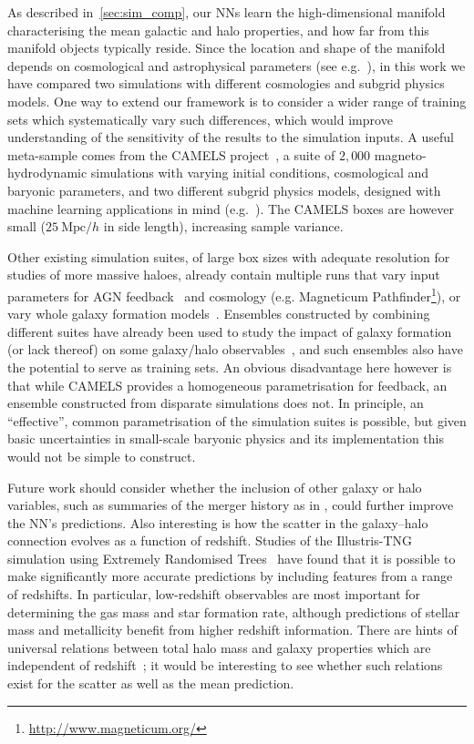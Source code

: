 \documentclass[usenatbib,useAMS]{mnras}
\begin{document}
As described in~\cref{sec:sim_comp}, our \acp{NN} learn the high-dimensional manifold characterising the mean galactic and halo properties, and how far from this manifold objects typically reside. Since the location and shape of the manifold depends on cosmological and astrophysical parameters (see e.g.~\cite{Villaescusa2022SingleGalaxy}), in this work we have compared two simulations with different cosmologies and subgrid physics models.  One way to extend our framework is to consider a wider range of training sets which systematically vary such differences, which would improve understanding of the sensitivity of the results to the simulation inputs. A useful meta-sample comes from the CAMELS project~\citep{CAMELS_2021,CAMELS_2022}, a suite of $2,000$ magneto-hydrodynamic simulations with varying initial conditions, cosmological and baryonic parameters, and two different subgrid physics models, designed  with machine learning applications in mind (e.g.~\citealt{Villaescusa_Navarro_2021_marg}). The CAMELS boxes are however small ($25~\mathrm{Mpc}/h$ in side length), increasing sample variance.

Other existing simulation suites, of large box sizes with adequate resolution for studies of more massive haloes, already contain multiple runs that vary input parameters for AGN feedback~\citep[e.g.][]{McCarthy2017Bahamas} and cosmology (e.g. Magneticum Pathfinder\footnote{\url{http://www.magneticum.org/}}), or vary whole galaxy formation models~\citep[eg.][]{Cui2018The300}. Ensembles constructed by combining different suites have already been used to study the impact of galaxy formation (or lack thereof) on some galaxy/halo observables~\citep[e.g.][]{Anbajagane2020Stellar, Lim2021Gas, Ragagnin2021HOD, Anbajagane2022GalaxyVel}, and such ensembles also have the potential to serve as training sets. An obvious disadvantage here however is that while CAMELS provides a homogeneous parametrisation for feedback, an ensemble constructed from disparate simulations does not. In principle, an ``effective'', common parametrisation of the simulation suites is possible, but given basic uncertainties in small-scale baryonic physics and its implementation this would not be simple to construct.

Future work should consider whether the inclusion of other galaxy or halo variables, such as summaries of the merger history as in \cite{Yongseok_2019}, could further improve the NN's predictions. Also interesting is how the scatter in the galaxy--halo connection evolves as a function of redshift. Studies of the Illustris-TNG simulation using Extremely Randomised Trees~\citep{McGibbon} have found that it is possible to make significantly more accurate predictions by including features from a range of redshifts. In particular, low-redshift observables are most important for determining the gas mass and star formation rate, although predictions of stellar mass and metallicity benefit from higher redshift information. There are hints of universal relations between total halo mass and galaxy properties which are independent of redshift~\citep{Shao_2021}; it would be interesting to see whether such relations exist for the scatter as well as the mean prediction.
\end{document}
